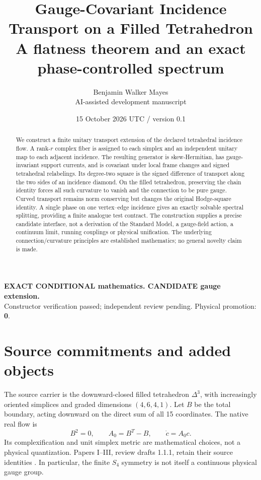 \documentclass[11pt,a4paper]{article}
\title{Gauge-Covariant Incidence Transport on a Filled Tetrahedron\\
\large A flatness theorem and an exact phase-controlled spectrum}
\author{Benjamin Walker Mayes\\\small AI-assisted development manuscript}
\date{15 October 2026 UTC / version 0.1}
\begin{document}
\maketitle
\begin{center}\small
\textbf{EXACT CONDITIONAL mathematics. CANDIDATE gauge extension.}\\
Constructor verification passed; independent review pending. Physical promotion: \textbf{0}.
\end{center}
\begin{abstract}
We construct a finite unitary transport extension of the declared tetrahedral
incidence flow. A rank-$r$ complex fiber is assigned to each simplex and an
independent unitary map to each adjacent incidence. The resulting generator is
skew-Hermitian, has gauge-invariant support currents, and is covariant under
local frame changes and signed tetrahedral relabelings. Its degree-two square
is the signed difference of transport along the two sides of an incidence
diamond. On the filled tetrahedron, preserving the chain identity forces all
such curvature to vanish and the connection to be pure gauge. Curved
transport remains norm conserving but changes the original Hodge-square
identity. A single phase on one vertex--edge incidence gives an exactly
solvable spectral splitting, providing a finite analogue test contract.
The construction supplies a precise candidate interface, not a derivation
of the Standard Model, a gauge-field action, a continuum limit, running
couplings or physical unification. The underlying connection/curvature
principles are established mathematics; no general novelty claim is made.
\end{abstract}

\section{Source commitments and added objects}
The source carrier is the downward-closed filled tetrahedron $\Delta^3$,
with increasingly oriented simplices and graded dimensions $(4,6,4,1)$.
Let $B$ be the total boundary, acting downward on the direct sum of all
15 coordinates. The native real flow is
\[
 B^2=0,\qquad A_0=B^T-B,\qquad \dot c=A_0c .
\]
Its complexification and unit simplex metric are mathematical choices,
not a physical quantization. Papers I--III, review drafts 1.1.1, retain
their source identities \cite{UD1,UD2,UD3}. In particular, the finite
$S_4$ symmetry is not itself a continuous physical gauge group.
\end{document}
